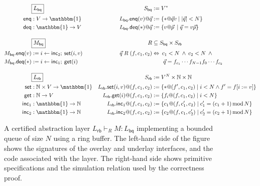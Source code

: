 \documentclass[sigplan,screen]{acmart}
\newcommand{\kw}[1]{\ensuremath{ \mathsf{#1} }}
\begin{document}
\begin{figure*} %
  \begin{minipage}{.9\textwidth}
    \begin{align*}
      & \fbox{$L_\kw{bq}$} &
        S_\kw{bq} &:= V^* \\
      \kw{enq} &: V \rightarrow \mathbbm{1} &
        L_\kw{bq}.\kw{enq}(v)@\vec{q} &:= \{ * @ \vec{q} v \mid |\vec{q}| < N \} \\
      \kw{deq} &: \mathbbm{1} \rightarrow V &
        L_\kw{bq}.\kw{deq}(*)@\vec{q} &:= \{ v @ \vec{p} \: \mid \vec{q} = v \vec{p} \}
      \\[1em]
      & \fbox{$M_\kw{bq}$} &
        R &\subseteq S_\kw{bq} \times S_\kw{rb} \\
      M_\kw{bq}.\kw{enq}(v) &:= i \leftarrow \kw{inc}_2 ; \: \kw{set}(i, v) &
        \vec{q} \mathrel{R} (f, c_1, c_2) &\Leftrightarrow
        \: c_1 < N \:\wedge\: c_2 < N \:\wedge\: {}
      \\
      M_\kw{bq}.\kw{deq}(*) &:= i \leftarrow \kw{inc}_1 ; \: \kw{get}(i) &
        & \qquad \vec{q} = f_{c_1} \cdots f_{N-1} f_0 \cdots f_{c_2}
      \\[1em]
      & \fbox{$L_\kw{rb}$} &
        S_\kw{rb} &:= V^N \times \mathbb{N} \times \mathbb{N}
      \\
      \kw{set} &: \mathbb{N} \times V \rightarrow \mathbbm{1} &
        L_\kw{rb}.\kw{set}(i, v)@(f, c_1, c_2) &:=
        \{ *@(f', c_1, c_2) \mid i < N \wedge f' = f[i := v] \}
      \\
      \kw{get} &: \mathbb{N} \rightarrow V &
        L_\kw{rb}.\kw{get}(i)@(f, c_1, c_2) &:=
        \{ f_i@(f, c_1, c_2) \mid i < N \}
      \\
      \kw{inc}_1 &: \mathbbm{1} \rightarrow \mathbb{N} &
        L_\kw{rb}.\kw{inc}_1@(f, c_1, c_2) &:=
        \{ c_1@(f, c_1', c_2) \mid
           c_1' = (c_1 + 1) \mathop{\mathrm{mod}} N \}
      \\
      \kw{inc}_2 &: \mathbbm{1} \rightarrow \mathbb{N} &
        L_\kw{rb}.\kw{inc}_2@(f, c_1, c_2) &:=
        \{ c_2@(f, c_1, c_2') \mid
           c_2' = (c_2 + 1) \mathop{\mathrm{mod}} N \}
    \end{align*}
  \end{minipage}
  \caption{A certified abstraction layer
    $L_\kw{rb} \vdash_R M : L_\kw{bq}$
    implementing a bounded queue of size $N$
    using a ring buffer.
    The left-hand side of the figure shows
    the signatures of the overlay and underlay interfaces,
    and the code associated with the layer.
    The right-hand side shows primitive specifications
    and the simulation relation used by the correctness proof.}
  \label{fig:cal}
\end{figure*}
\end{document}
